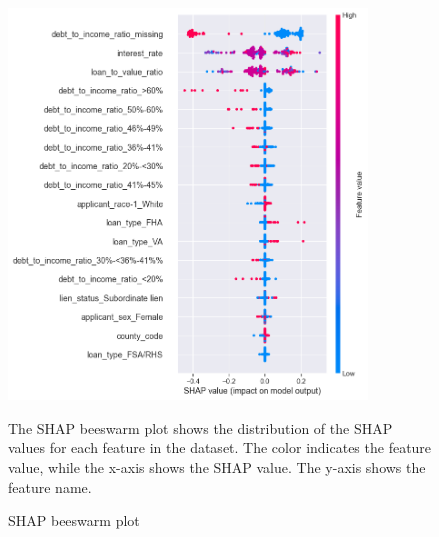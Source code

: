 \begin{figure}[h]
    \centering
    \includegraphics[width=0.85\textwidth]{images/SHAP_Individual_Analyses/beeswarm.png}
    \caption{SHAP beeswarm plot}
    \medskip
    \small
    The SHAP beeswarm plot shows the distribution of the SHAP values for each feature in the dataset. The color indicates the feature value, while the x-axis shows the SHAP value. The y-axis shows the feature name.
    \label{fig:SHAP_beeswarm}
\end{figure}

